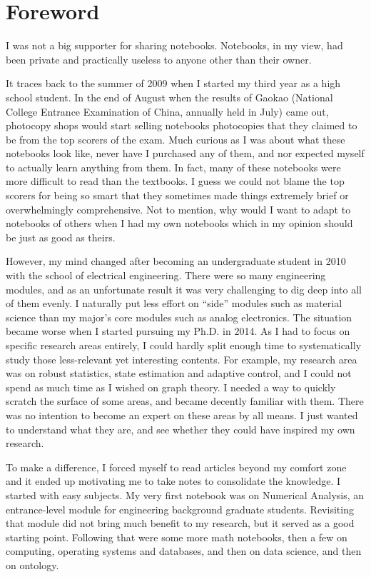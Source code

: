 \chapter*{Foreword}

I was not a big supporter for sharing notebooks. Notebooks, in my view, had been private and practically useless to anyone other than their owner. 

It traces back to the summer of 2009 when I started my third year as a high school student. In the end of August when the results of Gaokao (National College Entrance Examination of China, annually held in July) came out, photocopy shops would start selling notebooks photocopies that they claimed to be from the top scorers of the exam. Much curious as I was about what these notebooks look like, never have I purchased any of them, and nor expected myself to actually learn anything from them. In fact, many of these notebooks were more difficult to read than the textbooks. I guess we could not blame the top scorers for being so smart that they sometimes made things extremely brief or overwhelmingly comprehensive. Not to mention, why would I want to adapt to notebooks of others when I had my own notebooks which in my opinion should be just as good as theirs.

However, my mind changed after becoming an undergraduate student in 2010 with the school of electrical engineering. There were so many engineering modules, and as an unfortunate result it was very challenging to dig deep into all of them evenly. I naturally put less effort on ``side'' modules such as material science than my major's core modules such as analog electronics. The situation became worse when I started pursuing my Ph.D. in 2014. As I had to focus on specific research areas entirely, I could hardly split enough time to systematically study those less-relevant yet interesting contents. For example, my research area was on robust statistics, state estimation and adaptive control, and I could not spend as much time as I wished on graph theory. I needed a way to quickly scratch the surface of some areas, and became decently familiar with them. There was no intention to become an expert on these areas by all means. I just wanted to understand what they are, and see whether they could have inspired my own research.

To make a difference, I forced myself to read articles beyond my comfort zone and it ended up motivating me to take notes to consolidate the knowledge. I started with easy subjects. My very first notebook was on Numerical Analysis, an entrance-level module for engineering background graduate students. Revisiting that module did not bring much benefit to my research, but it served as a good starting point. Following that were some more math notebooks, then a few on computing, operating systems and databases, and then on data science, and then on ontology.

